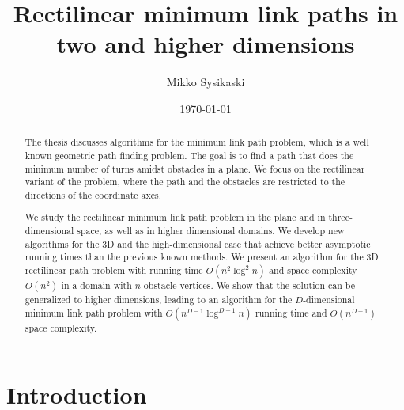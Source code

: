 \documentclass[english,gradu]{tktltiki2018}
\begin{document}
\title{Rectilinear minimum link paths in two and higher dimensions}
\author{Mikko Sysikaski}
\date{\today}

\maketitle






\begin{abstract}
The thesis discusses algorithms for the minimum link path problem, which is a well known geometric path finding problem.
The goal is to find a path that does the minimum number of turns amidst obstacles in a plane.
We focus on the rectilinear variant of the problem, where the path and the obstacles are restricted to the directions of the coordinate axes.

We study the rectilinear minimum link path problem in the plane and in three-dimensional space, as well as in higher dimensional domains.
We develop new algorithms for the 3D and the high-dimensional case that achieve better asymptotic running times than the previous known methods.
We present an algorithm for the 3D rectilinear path problem with running time $O(n^2\log^2 n)$ and space complexity $O(n^2)$ in a domain with $n$ obstacle vertices.
We show that the solution can be generalized to higher dimensions, leading to an algorithm for the $D$-dimensional minimum link path problem with $O(n^{D-1}\log^{D-1} n)$ running time and $O(n^{D-1})$ space complexity.
\end{abstract}

\mytableofcontents


\section{Introduction}
\end{document}
